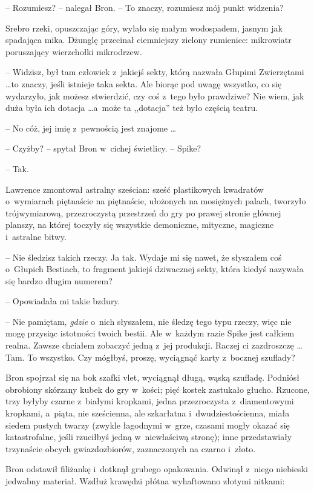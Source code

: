 \documentclass[oneside,polish,11pt,rmheadings]{mwbk}
\begin{document}
-- Rozumiesz? -- nalegał Bron. -- To znaczy, rozumiesz mój punkt widzenia? 

Srebro rzeki, opuszczając góry, wylało się małym wodospadem, jasnym jak spadająca mika. Dżunglę przecinał ciemniejszy zielony rumieniec: mikrowiatr poruszający wierzchołki mikrodrzew.  

-- Widzisz, był tam człowiek z~jakiejś sekty, którą nazwała Głupimi Zwierzętami \ldots  to znaczy, jeśli istnieje taka sekta. Ale biorąc pod uwagę wszystko, co się wydarzyło, jak możesz stwierdzić, czy coś z~tego było prawdziwe? Nie wiem, jak duża była ich dotacja \ldots  a~może ta ,,dotacja'' też było częścią teatru. 

-- No cóż, jej imię z~pewnością jest znajome \ldots   

-- Czyżby? -- spytał Bron w~cichej świetlicy.  -- Spike? 

-- Tak. 

Lawrence zmontował astralny sześcian: sześć plastikowych kwadratów o~wymiarach piętnaście na piętnaście, ułożonych na mosiężnych palach, tworzyło trójwymiarową, przezroczystą przestrzeń do gry po prawej stronie głównej planszy, na której toczyły się wszystkie demoniczne, mityczne, magiczne i~astralne bitwy. 

-- Nie śledzisz takich rzeczy. Ja tak. Wydaje mi się nawet, że słyszałem coś o~Głupich Bestiach, to fragment jakiejś dziwacznej sekty, która kiedyś nazywała się bardzo długim numerem? 

-- Opowiadała mi takie bzdury. 

-- Nie pamiętam, \textit{gdzie } o~nich słyszałem, nie śledzę tego typu rzeczy, więc nie mogę przysiąc istotności twoich bestii. Ale w~każdym razie Spike jest całkiem realna. Zawsze chciałem zobaczyć jedną z~jej produkcji. Raczej ci zazdroszczę \ldots  Tam. To wszystko. Czy mógłbyś, proszę, wyciągnąć karty z~bocznej szuflady? 

Bron spojrzał się na bok szafki vlet, wyciągnął długą, wąską szufladę. Podniósł obrobiony skórzany kubek do gry w~kości; pięć kostek zastukało głucho. Rzucone, trzy byłyby czarne z~białymi kropkami, jedna przezroczysta z~diamentowymi kropkami, a~piąta, nie sześcienna, ale szkarłatna i~dwudziestościenna, miała siedem pustych twarzy (zwykle łagodnymi w~grze, czasami mogły okazać się katastrofalne, jeśli rzuciłbyś jedną w~niewłaściwą stronę); inne przedstawiały trzynaście obcych gwiazdozbiorów, zaznaczonych na czarno i~złoto.  

Bron odstawił filiżankę i~dotknął grubego opakowania. Odwinął z~niego niebieski jedwabny materiał. Wzdłuż krawędzi płótna wyhaftowano złotymi nitkami: 
\medskip
\end{document}
